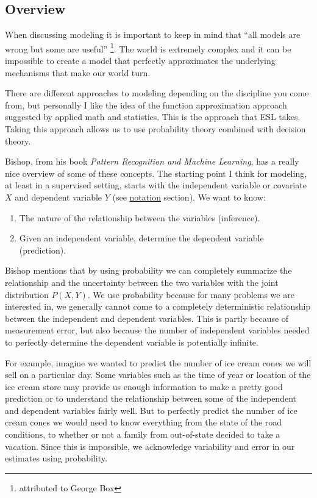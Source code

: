\subsection{Overview}

When discussing modeling it is important to keep in mind that ``all models are wrong but some are useful'' \footnote{attributed to George Box}. The world is extremely complex and it can be impossible to create a model that perfectly approximates the underlying mechanisms that make our world turn.

There are different approaches to modeling depending on the discipline you come from, but personally I like the idea of the function approximation approach suggested by applied math and statistics. This is the approach that ESL takes. Taking this approach allows us to use probability theory combined with decision theory.

Bishop, from his book \emph{Pattern Recognition and Machine Learning}, has a really nice overview of some of these concepts. The starting point I think for modeling, at least in a supervised setting, starts with the independent variable or covariate $X$ and dependent variable $Y$ (see \hyperref[sec:notation]{notation} section). We want to know:

\begin{enumerate}
\item The nature of the relationship between the variables (inference). 
\item Given an independent variable, determine the dependent variable (prediction).
\end{enumerate}

Bishop mentions that by using probability we can completely summarize the relationship and the uncertainty between the two variables with the joint distribution $P(X,Y)$. We use probability because for many problems we are interested in, we generally cannot come to a completely deterministic relationship between the independent and dependent variables. This is partly because of measurement error, but also because the number of independent variables needed to perfectly determine the dependent variable is potentially infinite. 

For example, imagine we wanted to predict the number of ice cream cones we will sell on a particular day. Some variables such as the time of year or location of the ice cream store may provide us enough information to make a pretty good prediction or to understand the relationship between some of the independent and dependent variables fairly well. But to perfectly predict the number of ice cream cones we would need to know everything from the state of the road conditions, to whether or not a family from out-of-state decided to take a vacation. Since this is impossible, we acknowledge variability and error in our estimates using probability.

